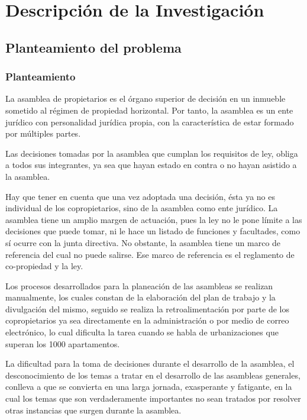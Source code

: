 \chapter{Descripción de la Investigación}
\section{Planteamiento del problema}

\subsection{Planteamiento}

La asamblea de propietarios es el órgano superior de decisión en un inmueble sometido al régimen de propiedad horizontal. Por tanto, la asamblea es un ente jurídico con personalidad jurídica propia, con la característica de estar formado por múltiples partes.

Las decisiones tomadas por la asamblea que cumplan los requisitos de ley, obliga a todos sus integrantes, ya sea que hayan estado en contra o no hayan asistido a la asamblea.

Hay que tener en cuenta que una vez adoptada una decisión, ésta ya no es individual de los copropietarios, sino de la asamblea como ente jurídico. La asamblea tiene un amplio margen de actuación, pues la ley no le pone límite a las decisiones que puede tomar, ni le hace un listado de funciones y facultades, como sí ocurre con la junta directiva. No obstante, la asamblea tiene un marco de referencia del cual no puede salirse. Ese marco de referencia es el reglamento de co-propiedad y la ley. 

Los procesos desarrollados para la planeación de las asambleas se realizan manualmente, los cuales constan de la elaboración del plan de trabajo y la divulgación del mismo, seguido se realiza la retroalimentación por parte de los copropietarios ya sea directamente en la administración o por medio de correo electrónico, lo cual dificulta la tarea cuando se habla de urbanizaciones que superan los 1000 apartamentos.

La dificultad para la toma de decisiones durante el desarrollo de la asamblea, el desconocimiento de los temas a tratar en el desarrollo de las asambleas generales, conlleva a que se convierta en una larga jornada, exasperante y fatigante, en la cual los temas que son verdaderamente importantes no sean tratados por resolver otras instancias que surgen durante la asamblea.

